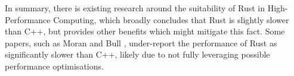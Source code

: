 



In summary, there is existing research around the suitability of Rust in High-Performance Computing, which broadly concludes that Rust is slightly slower than C++, but provides other benefits which might mitigate this fact. Some papers, such as Moran and Bull \cite{moranEmergingTechnologiesRust2023}, under-report the performance of Rust as significantly slower than C++, likely due to not fully leveraging possible performance optimisations.

